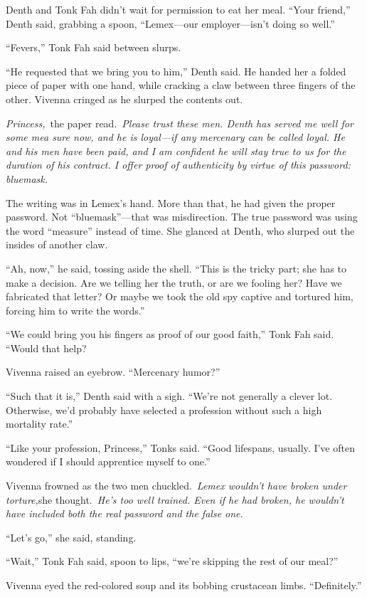 Denth and Tonk Fah didn’t wait for permission to eat her meal. “Your friend,” Denth said, grabbing a spoon, “Lemex—our employer—isn’t doing so well.”

“Fevers,” Tonk Fah said between slurps.

“He requested that we bring you to him,” Denth said. He handed her a folded piece of paper with one hand, while cracking a claw between three fingers of the other. Vivenna cringed as he slurped the contents out.

\textit{Princess,}~the paper read.~\textit{Please trust these men. Denth has served me well for some mea sure now, and he is loyal—if any mercenary can be called loyal. He and his men have been paid, and I am confident he will stay true to us for the duration of his contract. I offer proof of authenticity by virtue of this password: bluemask.}

The writing was in Lemex’s hand. More than that, he had given the proper password. Not “bluemask”—that was misdirection. The true password was using the word “measure” instead of time. She glanced at Denth, who slurped out the insides of another claw.

“Ah, now,” he said, tossing aside the shell. “This is the tricky part; she has to make a decision. Are we telling her the truth, or are we fooling her? Have we fabricated that letter? Or maybe we took the old spy captive and tortured him, forcing him to write the words.”

“We could bring you his fingers as proof of our good faith,” Tonk Fah said. “Would that help?

Vivenna raised an eyebrow. “Mercenary humor?”

“Such that it is,” Denth said with a sigh. “We’re not generally a clever lot. Otherwise, we’d probably have selected a profession without such a high mortality rate.”

“Like your profession, Princess,” Tonks said. “Good lifespans, usually. I’ve often wondered if I should apprentice myself to one.”

Vivenna frowned as the two men chuckled.~\textit{Lemex wouldn’t have broken under torture,}she thought.~\textit{He’s too well trained. Even if he had broken, he wouldn’t have included both the real password and the false one.}

“Let’s go,” she said, standing.

“Wait,” Tonk Fah said, spoon to lips, “we’re skipping the rest of our meal?”

Vivenna eyed the red-colored soup and its bobbing crustacean limbs. “Definitely.”

